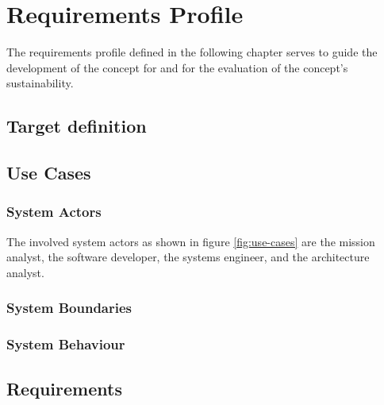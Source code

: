 \chapter{Requirements Profile}
\label{sec:requirements-profile}
The requirements profile defined in the following chapter serves to guide the development of the concept for \topic and for the evaluation of the concept's sustainability.

\section{Target definition}
\label{sec:target-definition}

\section{Use Cases}
\label{sec:use-cases}



\subsection{System Actors}
\label{sec:involved-actors}
The involved system actors as shown in figure \ref{fig:use-cases} are the mission analyst, the software developer, the systems engineer, and the architecture analyst.

\subsection{System Boundaries}
\label{sec:system-boundaries}

\subsection{System Behaviour}
\label{sec:system-behaviour}

\section{Requirements}
\label{sec:requirements}
